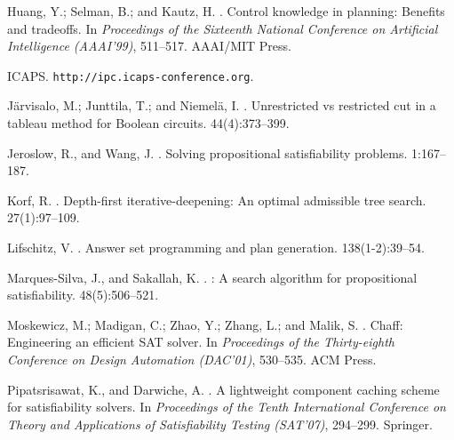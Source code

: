 \begin{thebibliography}{}
Huang, Y.; Selman, B.; and Kautz, H.
.
\newblock Control knowledge in planning: Benefits and tradeoffs.
\newblock In {\em Proceedings of the
  Sixteenth National Conference on Artificial Intelligence (AAAI'99)},
  511--517.
\newblock AAAI/MIT Press.

\newblock ICAPS. \texttt{http://ipc.icaps-conference.org}.

J{\"a}rvisalo, M.; Junttila, T.; and Niemel{\"a}, I.
.
\newblock Unrestricted vs restricted cut in a tableau method for {B}oolean
  circuits.
  44(4):373--399.

Jeroslow, R., and Wang, J.
.
\newblock Solving propositional satisfiability problems.
 1:167--187.

Korf, R.
.
\newblock Depth-first iterative-deepening: An optimal admissible tree search.
 27(1):97--109.

Lifschitz, V.
.
\newblock Answer set programming and plan generation.
 138(1-2):39--54.

Marques-Silva, J., and Sakallah, K.
.
: A search algorithm for propositional satisfiability.
 48(5):506--521.

Moskewicz, M.; Madigan, C.; Zhao, Y.; Zhang, L.; and Malik, S.
.
\newblock Chaff: Engineering an efficient {SAT} solver.
\newblock In {\em Proceedings of the Thirty-eighth Conference on Design
  Automation (DAC'01)},  530--535.
\newblock ACM Press.

Pipatsrisawat, K., and Darwiche, A.
.
\newblock A lightweight component caching scheme for satisfiability solvers.
\newblock In {\em Proceedings of the
  Tenth International Conference on Theory and Applications of Satisfiability
  Testing (SAT'07)},
  294--299.
\newblock Springer.


\end{thebibliography}
